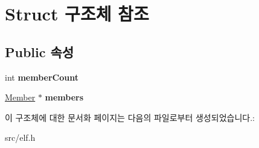 \hypertarget{struct_struct}{}\section{Struct 구조체 참조}
\label{struct_struct}
\subsection*{Public 속성}
\begin{DoxyCompactItemize}
\item 
\mbox{\label{struct_struct_a3dc20c2c1073675cfd036ae35d63d0ff}} 
int {\bfseries member\+Count}
\item 
\mbox{\label{struct_struct_aecffaae8752f8d8f85c33d5b05d29d2e}} 
\mbox{\hyperlink{struct_member}{Member}} $\ast$ {\bfseries members}
\end{DoxyCompactItemize}


이 구조체에 대한 문서화 페이지는 다음의 파일로부터 생성되었습니다.\+:\begin{DoxyCompactItemize}
\item 
src/elf.\+h\end{DoxyCompactItemize}
